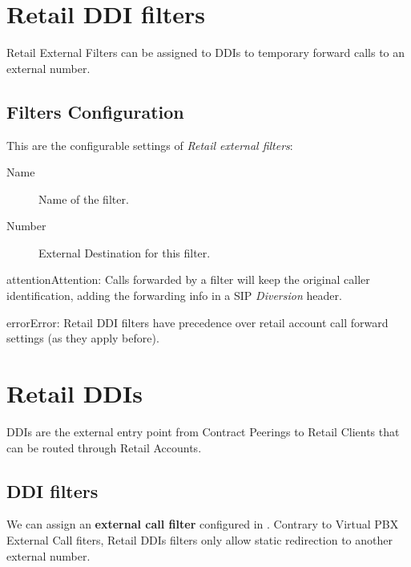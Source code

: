 \documentclass[letterpaper,10pt,english]{sphinxmanual}
\begin{document}
\section{Retail DDI filters}
\label{retail/retail_filters:retail-ddi-filters}\label{retail/retail_filters::doc}\label{retail/retail_filters:retail-filters}
Retail External Filters can be assigned to DDIs to temporary
forward calls to an external number.


\subsection{Filters Configuration}
\label{retail/retail_filters:filters-configuration}
This are the configurable settings of \emph{Retail external filters}:
\begin{description}
\item[{Name}] \leavevmode{}\label{retail/retail_filters:term-name}
Name of the filter.

\item[{Number}] \leavevmode{}\label{retail/retail_filters:term-number}
External Destination for this filter.

\end{description}

\begin{notice}{attention}{Attention:}
Calls forwarded by a filter will keep the original
caller identification, adding the forwarding info in a SIP
\emph{Diversion} header.
\end{notice}

\begin{notice}{error}{Error:}
Retail DDI filters have precedence over retail account call forward settings (as they apply before).
\end{notice}


\section{Retail DDIs}
\label{retail/retail_ddis::doc}\label{retail/retail_ddis:retail-ddis}\label{retail/retail_ddis:id1}
DDIs are the external entry point from Contract Peerings to Retail Clients that
can be routed through Retail Accounts.


\subsection{DDI filters}
\label{retail/retail_ddis:ddi-filters}
We can assign an \textbf{external call filter} configured in {\hyperref[retail/retail_filters:retail\string-filters]{}}. Contrary to Virtual PBX External Call fiters, Retail DDIs
filters only allow static redirection to another external number.
\end{document}
